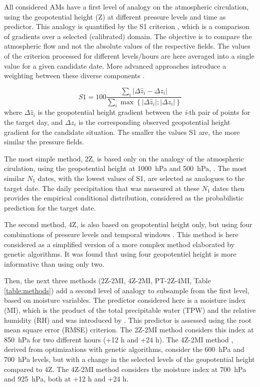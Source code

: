 \documentclass[alpha-refs]{wiley-article}
\begin{document}
All considered AMs have a first level of analogy on the atmospheric circulation, using the geopotential height (Z) at different pressure levels and time as predictor. This analogy is quantified by the S1 criterion \citep[Eq.\ \ref{eq:S1}, ][]{Teweles1954, Brown2012}, which is a comparison of gradients over a selected (calibrated) domain. The objective is to compare the atmospheric flow and not the absolute values of the respective fields. The values of the criterion processed for different levels/hours are here averaged into a single value for a given candidate date. More advanced approaches introduce a weighting between these diverse components \citep{Horton2017a}.

\begin{equation}
	\label{eq:S1}
	S1=100 \frac{\sum_{i} \vert \Delta\hat{z}_{i} - \Delta z_{i} \vert}{\sum_{i} \max\left\lbrace \vert \Delta\hat{z}_{i} \vert; \vert \Delta z_{i} \vert \right\rbrace }
\end{equation}
where $\Delta \hat{z}_{i}$ is the geopotential height gradient between the \textit{i}-th pair of points for the target day, and $\Delta z_{i}$ is the corresponding observed geopotential height gradient for the candidate situation. The smaller the values S1 are, the more similar the pressure fields.

The most simple method, 2Z, is based only on the analogy of the atmospheric cirulation, using the geopotential height at 1000~hPa and 500~hPa, \citep{Bontron2004}. The most similar $N_{1}$ dates, with the lowest values of S1, are selected as analogues to the target date. The daily precipitation that was measured at these $N_{1}$ dates then provides the empirical conditional distribution, considered as the probabilistic prediction for the target date.

The second method, 4Z, is also based on geopotential height only, but using four combinations of pressure levels and temporal windows \citep{Horton2018a}. This method is here considered as a simplified version of a more complex method elaborated by genetic algorithms. It was found that using four geopotentiel height is more informative than using only two.

Then, the next three methods (2Z-2MI, 4Z-2MI, PT-2Z-4MI, Table \ref{table:methods}) add a second level of analogy to subsample from the first level, based on moisture variables. The predictor considered here is a moisture index (MI), which is the product of the total precipitable water (TPW) and the relative humidity (RH) and was introduced by \citet{Bontron2004}. This predictor is assessed using the root mean square error (RMSE) criterion. The 2Z-2MI method \citep{Bontron2004} considers this index at 850~hPa for two different hours (+12 h and +24 h). The 4Z-2MI method \citep{Horton2018a}, derived from optimizations with genetic algorithms, consider the 600~hPa and 700~hPa levels, but with a change in the selected levels of the geopotential height compared to 4Z. The 4Z-2MI method \citep{BenDaoud2016} considers the moisture index at 700~hPa and 925~hPa, both at +12 h and +24 h.
\end{document}
